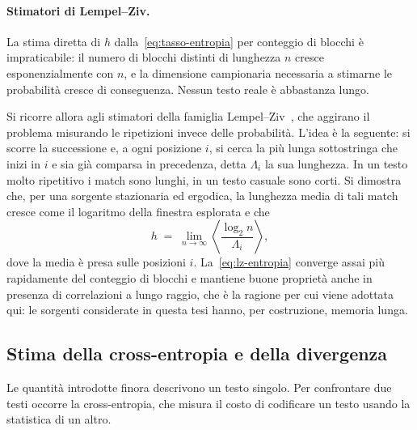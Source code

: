 \paragraph{Stimatori di Lempel--Ziv.}
La stima diretta di $h$ dalla~\eqref{eq:tasso-entropia} per conteggio di blocchi
è impraticabile: il numero di blocchi distinti di lunghezza $n$ cresce
esponenzialmente con $n$, e la dimensione campionaria necessaria a stimarne le
probabilità cresce di conseguenza. Nessun testo reale è abbastanza lungo.

Si ricorre allora agli stimatori della famiglia Lempel--Ziv~\cite{ziv1977},
che aggirano il problema misurando le ripetizioni invece delle probabilità.
L'idea è la seguente: si scorre la successione e, a ogni posizione $i$, si cerca
la più lunga sottostringa che inizi in $i$ e sia già comparsa in precedenza,
detta $\Lambda_i$ la sua lunghezza. In un testo molto ripetitivo i match sono
lunghi, in un testo casuale sono corti. Si dimostra che, per una sorgente
stazionaria ed ergodica, la lunghezza media di tali match cresce come il
logaritmo della finestra esplorata e che
\begin{equation}
  h \;=\; \lim_{n\to\infty}
  \left\langle \frac{\log_2 n}{\Lambda_i} \right\rangle ,
  \label{eq:lz-entropia}
\end{equation}
dove la media è presa sulle posizioni $i$. La~\eqref{eq:lz-entropia} converge
assai più rapidamente del conteggio di blocchi e mantiene buone proprietà anche
in presenza di correlazioni a lungo raggio, che è la ragione per cui viene
adottata qui: le sorgenti considerate in questa tesi hanno, per costruzione,
memoria lunga.

\subsection{Stima della cross-entropia e della divergenza}
\label{sec:crossparsing}

Le quantità introdotte finora descrivono un testo singolo. Per confrontare due
testi occorre la cross-entropia, che misura il costo di codificare un testo
usando la statistica di un altro.

